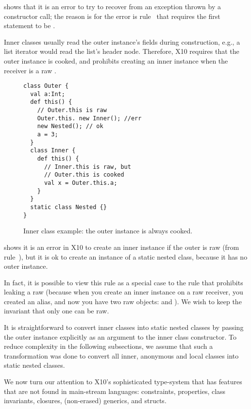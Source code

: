  shows that it is an error to try to recover from an exception thrown
    by a constructor call;
    the reason is for the error is rule~ that requires the first statement to be .


Inner classes usually read the outer instance's fields during construction,
    e.g., a list iterator would read the list's header node.
Therefore, X10 requires that the outer instance is cooked,
    and prohibits creating an inner instance when the receiver is a raw \this.


\begin{figure}
\begin{lstlisting}
class Outer {
  val a:Int;
  def this() {
    // Outer.this is raw
    Outer.this. new Inner(); //err
    new Nested(); // ok
    a = 3;
  }
  class Inner {
    def this() {
      // Inner.this is raw, but
      // Outer.this is cooked
      val x = Outer.this.a;
    }
  }
  static class Nested {}
}
\end{lstlisting}
\caption{Inner class example: the outer instance is always cooked.
    }
\label{Figure:InnerClass}
\end{figure}

 shows it is an error in X10 to create an inner instance
    if the outer is raw (from rule~),
    but it is ok to create an instance of a static nested class,
    because it has no outer instance.

In fact, it is possible to view this rule as a special case to the rule that
    prohibits leaking a raw \this
    (because when you create an inner instance on a raw \this receiver,
    you created an alias,
    and now you have two raw objects:  and ).
We wish to keep the invariant that only one \this can be raw.

It is straightforward to convert inner classes into static nested classes
    by passing the outer instance explicitly as an argument to the inner class constructor.
To reduce complexity in the following subsections, we assume
    that such a transformation was done to convert all inner, anonymous and local classes into
    static nested classes.






We now turn our attention to X10's sophisticated type-system
    that has features that are not found in main-stream languages:
    constraints, properties, class invariants, closures, (non-erased) generics, and structs.


